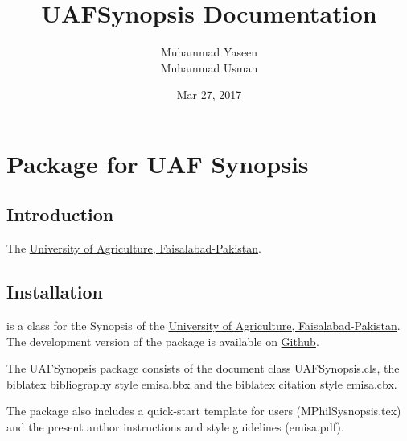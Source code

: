 \documentclass[letterpaper,10pt,english]{sphinxmanual}
\title{UAFSynopsis Documentation}
\date{Mar 27, 2017}
\author{Muhammad Yaseen\\Muhammad Usman}
\begin{document}
\maketitle
\sphinxtableofcontents
{}\label{\detokenize{index::doc}}



\chapter{ Package for UAF Synopsis}
\label{\detokenize{index:uafsynopsis-s-documentation}}\label{\detokenize{index:latex-package-for-uaf-synopsis}}

\section{Introduction}
\label{\detokenize{index:introduction}}
The \href{https://uaf.edu.pk}{University of Agriculture, Faisalabad-Pakistan}.


\section{Installation}
\label{\detokenize{index:installation}}
 is a   class for the Synopsis of the \href{https://uaf.edu.pk}{University of Agriculture, Faisalabad-Pakistan}. The development version of the package is available on \href{https://github.com/MYaseen208/UAFSynopsis}{Github}.

The UAFSynopsis  package consists of the document class UAFSynopsis.cls, the biblatex bibliography style emisa.bbx and the biblatex citation style emisa.cbx.

The package also includes a quick-start template for users (MPhilSysnopsis.tex) and the
present author instructions and style guidelines (emisa.pdf).
\end{document}
